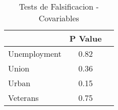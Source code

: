 \begin{table}[H]\centering            \begin{threeparttable} \def\sym#1{\ifmmode^{#1}\else\(^{#1}\)\fi}            \caption{Tests de Falsificacion - Covariables}
\label{pvalues\_table}
\begin{tabular}{l*{2}c}
\hline
\hline
            &\multicolumn{1}{c}{P Value}\\
\hline
Unemployment&        0.82\\
Union       &        0.36\\
Urban       &        0.15\\
Veterans    &        0.75\\
\hline
\hline
\end{tabular}
\begin{tablenotes}
\begin{footnotesize}
\end{footnotesize}
\end{tablenotes} \end{threeparttable} \end{table}
